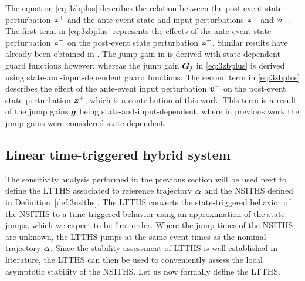 \documentclass[../DC2017114Bouma.tex]{subfiles}
\begin{document}
The equation \eqref{eq:3zbplus} describes the relation between the post-event state perturbation ${\boldsymbol{z}}^+$ and the ante-event state and input perturbations ${\boldsymbol{z}}^-$ and ${\boldsymbol{v}}^-$. The first term in \eqref{eq:3zbplus} represents the effects of the ante-event state perturbation ${\boldsymbol{z}}^-$ on the post-event state perturbation ${\boldsymbol{z}}^+$. Similar results have already been obtained in \cite{Rijnen2018}. The jump gain in \cite{Rijnen2018} is derived with state-dependent guard functions however, whereas the jump gain ${\boldsymbol{G}}_j$ in \eqref{eq:3zbplus} is derived using state-and-input-dependent guard functions. The second term in \eqref{eq:3zbplus} describes the effect of the ante-event input perturbation ${\boldsymbol{v}}^-$ on the post-event state perturbation ${\boldsymbol{z}}^+$, which is a contribution of this work. This term is a result of the jump gains ${\boldsymbol{g}}$ being state-and-input-dependent, where in previous work the jump gains were considered state-dependent.
\subsection{Linear time-triggered hybrid system}
The sensitivity analysis performed in the previous section will be used next to define the LTTHS associated to reference trajectory $\boldsymbol{\alpha}$ and the NSITHS defined in Definition~\ref{def:3nsiths}. The LTTHS converts the state-triggered behavior of the NSITHS to a time-triggered behavior using an approximation of the state jumps, which we expect to be first order. Where the jump times of the NSITHS are unknown, the LTTHS jumps at the same event-times as the nominal trajectory $\boldsymbol{\alpha}$. Since the stability assessment of LTTHS is well established in literature, the LTTHS can then be used to conveniently assess the local asymptotic stability of the NSITHS. Let us now formally define the LTTHS.
\end{document}
